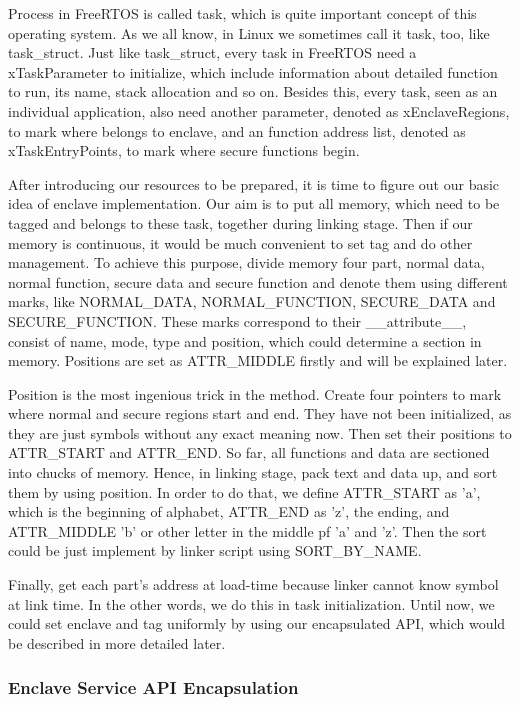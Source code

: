 \documentclass[conference]{IEEEtran}
\begin{document}
Process in FreeRTOS  is called task, which is quite important concept of this operating system. As we all know, in Linux we sometimes call it task, too, like task\_struct. Just like task\_struct, every task in FreeRTOS need a xTaskParameter to initialize, which include information about detailed function to run, its name, stack allocation and so on. Besides this, every task, seen as an individual application, also need another parameter, denoted as xEnclaveRegions, to mark where belongs to enclave, and an function address list, denoted as xTaskEntryPoints, to mark where secure functions begin.

After introducing our resources to be prepared, it is time to figure out our basic idea of enclave implementation. Our aim is to put all memory, which need to be tagged and belongs to these task, together during linking stage. Then if our memory is continuous, it would be much convenient to set tag and do other management. To achieve this purpose, divide memory four part, normal data, normal function, secure data and secure function and denote them using different marks, like NORMAL\_DATA, NORMAL\_FUNCTION, SECURE\_DATA and SECURE\_FUNCTION. These marks correspond to their \_\_attribute\_\_, consist of name, mode, type and position, which could determine a section in memory. Positions are set as ATTR\_MIDDLE firstly and will be explained later.

Position is the most ingenious trick in the method. Create four pointers to mark where normal and secure regions start and end. They have not been initialized, as they are just symbols without any exact meaning now. Then set their positions to ATTR\_START and ATTR\_END. So far, all functions and data are sectioned into chucks of memory.  Hence, in linking stage, pack text and data up, and sort them by using position. In order to do that, we define ATTR\_START as 'a', which is the beginning of alphabet, ATTR\_END as 'z', the ending, and ATTR\_MIDDLE 'b' or other letter in the middle pf 'a' and 'z'. Then the sort could be just implement by linker script using SORT\_BY\_NAME.

Finally, get each part's address at load-time because linker cannot know symbol at link time. In the other words, we do this in task initialization. Until now, we could set enclave and tag uniformly by using our encapsulated API, which would be described in more detailed later.

\subsubsection{Enclave Service API Encapsulation}
\end{document}

